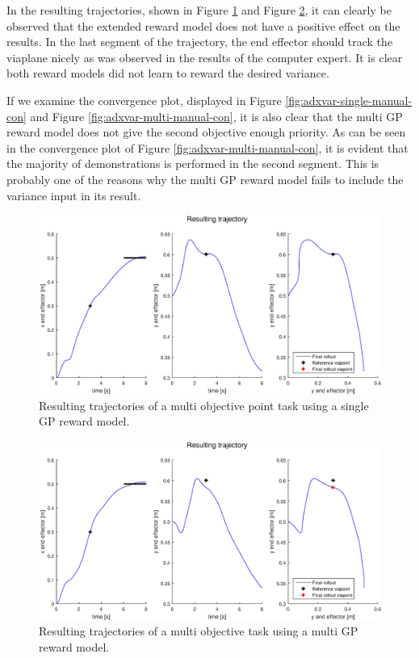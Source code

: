 \documentclass[mscThesis.tex]{subfiles}
\begin{document}
In the resulting trajectories, shown in Figure \ref{fig:adxvar-single-manual-traject} and Figure \ref{fig:adxvar-multi-manual-traject}, it can clearly be observed that the extended reward model does not have a positive effect on the results. In the last segment of the trajectory, the end effector should track the viaplane nicely as was observed in the results of the computer expert. It is clear both reward models did not learn to reward the desired variance. 

If we examine the convergence plot, displayed in Figure \ref{fig:adxvar-single-manual-con} and Figure \ref{fig:adxvar-multi-manual-con}, it is also clear that the multi GP reward model does not give the second objective enough priority. As can be seen in the convergence plot of Figure \ref{fig:adxvar-multi-manual-con}, it is evident that the majority of demonstrations is performed in the second segment. This is probably one of the reasons why the multi GP reward model fails to include the variance input in its result. 

\begin{figure}[!htb]
    \centering
    \includegraphics[width=\textwidth, height = 6 cm]{figures/results/advancedx-var/trajectory_single_manual.eps}
    \caption{Resulting trajectories of a multi objective point task using a single GP reward model.}
    \label{fig:adxvar-single-manual-traject}    
\end{figure}
   
\begin{figure}[!htb] 
    \centering
    \includegraphics[width=\textwidth, height = 6 cm]{figures/results/advancedx-var/trajectory_multi_manual.eps}
    \caption{Resulting trajectories of a multi objective task using a multi GP reward model.}
    \label{fig:adxvar-multi-manual-traject}
\end{figure}
\end{document}
